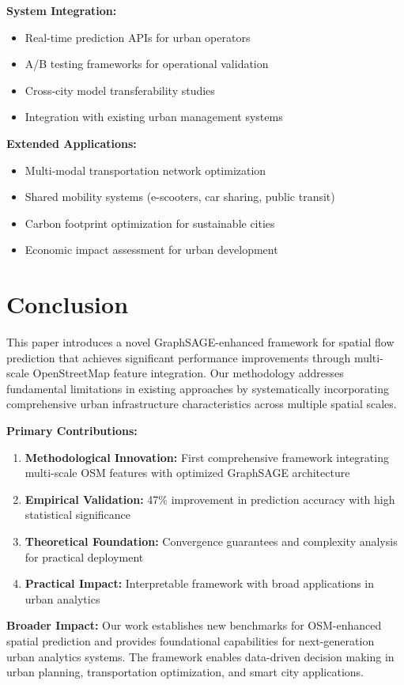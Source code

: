\documentclass[twocolumn,11pt]{IEEEtran}  %
\begin{document}
\textbf{System Integration:}
\begin{itemize}
\item Real-time prediction APIs for urban operators
\item A/B testing frameworks for operational validation
\item Cross-city model transferability studies
\item Integration with existing urban management systems
\end{itemize}

\textbf{Extended Applications:}
\begin{itemize}
\item Multi-modal transportation network optimization
\item Shared mobility systems (e-scooters, car sharing, public transit)
\item Carbon footprint optimization for sustainable cities
\item Economic impact assessment for urban development
\end{itemize}

\section{Conclusion}

This paper introduces a novel GraphSAGE-enhanced framework for spatial flow prediction that achieves significant performance improvements through multi-scale OpenStreetMap feature integration. Our methodology addresses fundamental limitations in existing approaches by systematically incorporating comprehensive urban infrastructure characteristics across multiple spatial scales.

\textbf{Primary Contributions:}
\begin{enumerate}
\item \textbf{Methodological Innovation:} First comprehensive framework integrating multi-scale OSM features with optimized GraphSAGE architecture
\item \textbf{Empirical Validation:} 47\% improvement in prediction accuracy with high statistical significance
\item \textbf{Theoretical Foundation:} Convergence guarantees and complexity analysis for practical deployment
\item \textbf{Practical Impact:} Interpretable framework with broad applications in urban analytics
\end{enumerate}

\textbf{Broader Impact:} Our work establishes new benchmarks for OSM-enhanced spatial prediction and provides foundational capabilities for next-generation urban analytics systems. The framework enables data-driven decision making in urban planning, transportation optimization, and smart city applications.
\end{document}
